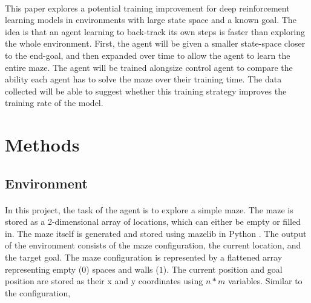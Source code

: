 \documentclass[12pt]{article}
\begin{document}

\paragraph{}
This paper explores a potential training improvement for deep reinforcement learning models in environments with large state space and a known goal.
The idea is that an agent learning to back-track its own steps is faster than exploring the whole environment.
First, the agent will be given a smaller state-space closer to the end-goal, and then expanded over time to allow the agent to learn the entire maze.
The agent will be trained alongsize control agent to compare the ability each agent has to solve the maze over their training time.
The data collected will be able to suggest whether this training strategy improves the training rate of the model.

\section{Methods}


\subsection{Environment}
\paragraph{}

In this project, the task of the agent is to explore a simple maze.
The maze is stored as a 2-dimensional array of locations, which can either be empty or filled in.
The maze itself is generated and stored using mazelib \cite{lib_mazelib} in Python \cite{lang_python}.
The output of the environment consists of the maze configuration, the current location, and the target goal.
The maze configuration is represented by a flattened array representing empty ($0$) spaces and walls ($1$).
The current position and goal position are stored as their x and y coordinates using $n * m$ variables.
Similar to the configuration, 

%
\end{document}
